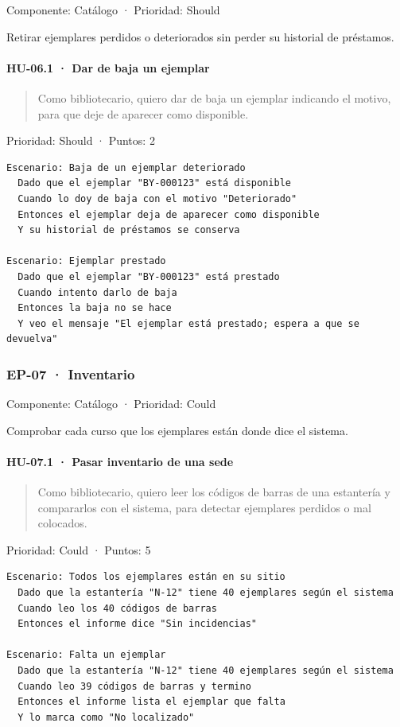 Componente: Catálogo · Prioridad: Should

Retirar ejemplares perdidos o deteriorados sin perder su historial de préstamos.

\paragraph*{HU-06.1 · Dar de baja un ejemplar}

\begin{quote}
Como bibliotecario, quiero dar de baja un ejemplar indicando el motivo, para que deje de aparecer como disponible.
\end{quote}

Prioridad: Should · Puntos: 2

\begin{Verbatim}[breaklines,fontsize=\small,frame=single,framerule=0.4pt,rulecolor=\color{black!25}]
Escenario: Baja de un ejemplar deteriorado
  Dado que el ejemplar "BY-000123" está disponible
  Cuando lo doy de baja con el motivo "Deteriorado"
  Entonces el ejemplar deja de aparecer como disponible
  Y su historial de préstamos se conserva

Escenario: Ejemplar prestado
  Dado que el ejemplar "BY-000123" está prestado
  Cuando intento darlo de baja
  Entonces la baja no se hace
  Y veo el mensaje "El ejemplar está prestado; espera a que se devuelva"
\end{Verbatim}

\subsubsection*{EP-07 · Inventario}

Componente: Catálogo · Prioridad: Could

Comprobar cada curso que los ejemplares están donde dice el sistema.

\paragraph*{HU-07.1 · Pasar inventario de una sede}

\begin{quote}
Como bibliotecario, quiero leer los códigos de barras de una estantería y compararlos con el sistema, para detectar ejemplares perdidos o mal colocados.
\end{quote}

Prioridad: Could · Puntos: 5

\begin{Verbatim}[breaklines,fontsize=\small,frame=single,framerule=0.4pt,rulecolor=\color{black!25}]
Escenario: Todos los ejemplares están en su sitio
  Dado que la estantería "N-12" tiene 40 ejemplares según el sistema
  Cuando leo los 40 códigos de barras
  Entonces el informe dice "Sin incidencias"

Escenario: Falta un ejemplar
  Dado que la estantería "N-12" tiene 40 ejemplares según el sistema
  Cuando leo 39 códigos de barras y termino
  Entonces el informe lista el ejemplar que falta
  Y lo marca como "No localizado"
\end{Verbatim}

